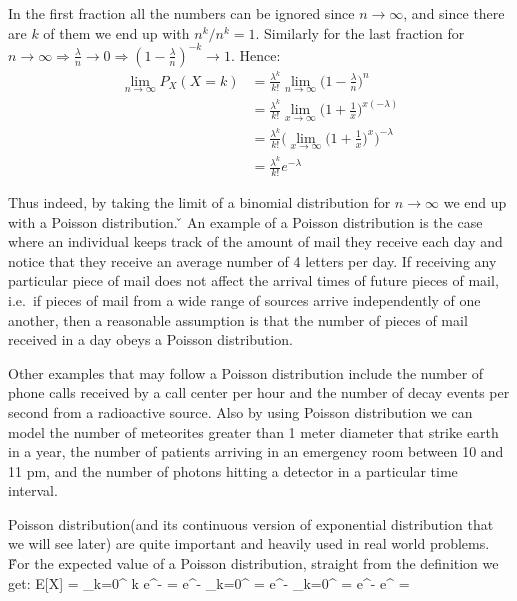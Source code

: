 In the first fraction all the numbers can be ignored since $n \to \infty$, and since there are $k$ of them we end up
with $n^k/n^k = 1$. Similarly for the last fraction for $n \to \infty \Rightarrow \frac{\lambda}{n} \to 0 \Rightarrow
(1-\frac{\lambda}{n})^{-k} \to 1$. Hence:
{\setlength{\jot}{10pt}
\begin{align*}
\lim_{n\to\infty} P_{X}(X=k) &= \frac{\lambda^k}{k!} \lim_{n\to\infty} \Big( 1-\frac{\lambda}{n} \Big)^{n}\\
&= \frac{\lambda^k}{k!} \lim_{x\to\infty} \Big( 1+\frac{1}{x} \Big)^{x(-\lambda)} \\
&= \frac{\lambda^k}{k!} \Big(\lim_{x\to\infty} \Big(1+\frac{1}{x}\Big)^{x}\Big)^{-\lambda} \\
&= \frac{\lambda^k}{k!} e^{-\lambda}
\end{align*}}

Thus indeed, by taking the limit of a binomial distribution for $n \to \infty$ we end up with a Poisson distribution. \v

\be
An example of a Poisson distribution is the case where an individual keeps track of the amount of mail they receive
each day and notice that they receive an average number of 4 letters per day. If receiving any particular piece of
mail does not affect the arrival times of future pieces of mail, i.e.\ if pieces of mail from a wide range of sources
arrive independently of one another, then a reasonable assumption is that the number of pieces of mail received in a
day obeys a Poisson distribution.
\ee

\be
Other examples that may follow a Poisson distribution include the number of phone calls received by a call center per
hour and the number of decay events per second from a radioactive source. Also by using Poisson distribution we can
model the number of meteorites greater than 1 meter diameter that strike earth in a year, the number of patients
arriving in an emergency room between 10 and 11 pm, and the number of photons hitting a detector in a particular time
interval.
\ee

Poisson distribution(and its continuous version of exponential distribution that we will see later) are quite
important and heavily used in real world problems. \v

For the expected value of a Poisson distribution, straight from the definition we get:
\bse
E[X] = \sum _{k=0}^{\infty} k e^{-\lambda} 
= e^{-\lambda} \sum _{k=0}^{\infty} = \lambda e^{-\lambda}
\sum _{k=0}^{\infty} = \lambda e^{-\lambda} e^{\lambda} = \lambda
\ese


